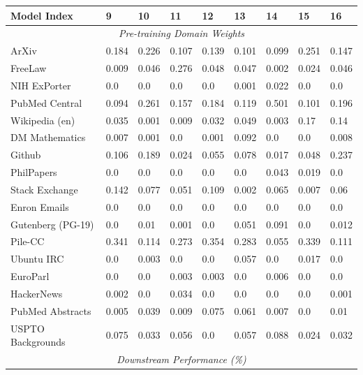 \documentclass{article}
\theoremstyle{definition}
\theoremstyle{remark}
\begin{document}
\begin{table}[!ht]
    \centering
    \begin{tabular}{lllllllll}
    \toprule
        \textbf{Model Index} & \textbf{9} & \textbf{10} & \textbf{11} & \textbf{12} & \textbf{13} & \textbf{14} & \textbf{15} & \textbf{16} \\
        \midrule
        \multicolumn{9}{c}{\textit{Pre-training Domain Weights}} \\
        ArXiv & 0.184 & 0.226 & 0.107 & 0.139 & 0.101 & 0.099 & 0.251 & 0.147 \\ 
        FreeLaw & 0.009 & 0.046 & 0.276 & 0.048 & 0.047 & 0.002 & 0.024 & 0.046 \\ 
        NIH ExPorter & 0.0 & 0.0 & 0.0 & 0.0 & 0.001 & 0.022 & 0.0 & 0.0 \\ 
        PubMed Central & 0.094 & 0.261 & 0.157 & 0.184 & 0.119 & 0.501 & 0.101 & 0.196 \\ 
        Wikipedia (en) & 0.035 & 0.001 & 0.009 & 0.032 & 0.049 & 0.003 & 0.17 & 0.14 \\ 
        DM Mathematics & 0.007 & 0.001 & 0.0 & 0.001 & 0.092 & 0.0 & 0.0 & 0.008 \\ 
        Github & 0.106 & 0.189 & 0.024 & 0.055 & 0.078 & 0.017 & 0.048 & 0.237 \\ 
        PhilPapers & 0.0 & 0.0 & 0.0 & 0.0 & 0.0 & 0.043 & 0.019 & 0.0 \\ 
        Stack Exchange & 0.142 & 0.077 & 0.051 & 0.109 & 0.002 & 0.065 & 0.007 & 0.06 \\ 
        Enron Emails & 0.0 & 0.0 & 0.0 & 0.0 & 0.0 & 0.0 & 0.0 & 0.0 \\ 
        Gutenberg (PG-19) & 0.0 & 0.01 & 0.001 & 0.0 & 0.051 & 0.091 & 0.0 & 0.012 \\ 
        Pile-CC & 0.341 & 0.114 & 0.273 & 0.354 & 0.283 & 0.055 & 0.339 & 0.111 \\ 
        Ubuntu IRC & 0.0 & 0.003 & 0.0 & 0.0 & 0.057 & 0.0 & 0.017 & 0.0 \\ 
        EuroParl & 0.0 & 0.0 & 0.003 & 0.003 & 0.0 & 0.006 & 0.0 & 0.0 \\ 
        HackerNews & 0.002 & 0.0 & 0.034 & 0.0 & 0.0 & 0.0 & 0.0 & 0.001 \\ 
        PubMed Abstracts & 0.005 & 0.039 & 0.009 & 0.075 & 0.061 & 0.007 & 0.0 & 0.01 \\ 
        USPTO Backgrounds & 0.075 & 0.033 & 0.056 & 0.0 & 0.057 & 0.088 & 0.024 & 0.032 \\
        \midrule
        \multicolumn{9}{c}{\textit{Downstream Performance (\%)}} \\

\end{tabular}
\end{table}
\end{document}
